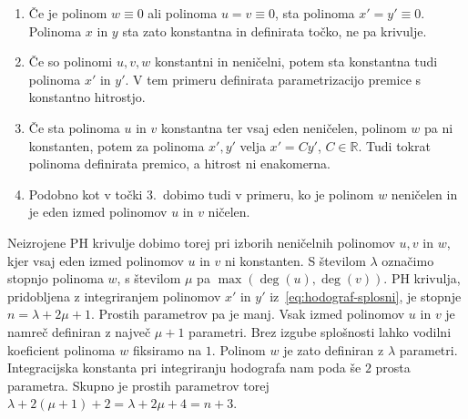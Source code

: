 \documentclass[isrm2, tisk]{fmfdelo}
\newcommand{\R}{\mathbb R}
\newcommand{\mycomment}[1]{\textbf{\textcolor{red}{#1}}}
\begin{document}
    \begin{enumerate}[wide, labelwidth=!, labelindent=10pt]
        \itemsep0em
        \item  Če je polinom $w\equiv 0$ ali polinoma $u=v \equiv 0$, sta polinoma $x'=y'\equiv 0$.
        Polinoma $x$ in $y$ sta zato konstantna in definirata točko, ne pa krivulje.
        \item  Če so polinomi $u,v,w$ konstantni in neničelni, potem sta konstantna tudi polinoma $x'$ in $y'$.
        V tem primeru definirata parametrizacijo premice s konstantno hitrostjo.
        \item  Če sta polinoma $u$ in $v$ konstantna ter vsaj eden neničelen, polinom $w$ pa ni konstanten, potem za polinoma $x',y'$ velja $x'=Cy'$, $C\in \R$.
        Tudi tokrat polinoma definirata premico, a hitrost ni enakomerna.
        \item Podobno kot v točki 3.\ dobimo tudi v primeru, ko je polinom $w$ neničelen in je eden izmed polinomov $u$ in $v$ ničelen.
    \end{enumerate}
    \noindent Neizrojene PH krivulje dobimo torej pri izborih neničelnih polinomov $u,v$ in $w$, kjer vsaj eden izmed polinomov $u$ in $v$ ni konstanten.
    S številom $\lambda$ označimo stopnjo polinoma $w$, s številom $\mu$ pa $\max(\deg(u),\deg(v))$.
    PH krivulja, pridobljena z integriranjem polinomov $x'$ in $y'$ iz~\eqref{eq:hodograf-splosni}, je stopnje $n=\lambda + 2\mu + 1$.
    Prostih parametrov pa je manj.
    Vsak izmed polinomov $u$ in $v$ je namreč definiran z največ $\mu + 1$ parametri.
    Brez izgube splošnosti lahko vodilni koeficient polinoma $w$ fiksiramo na $1$.
    Polinom $w$ je zato definiran z $\lambda$ parametri.
    Integracijska konstanta pri integriranju hodografa nam poda še $2$ prosta parametra.
    Skupno je prostih parametrov torej $\lambda + 2(\mu+1)+2=\lambda + 2\mu+4 = n+3$.
\end{document}
